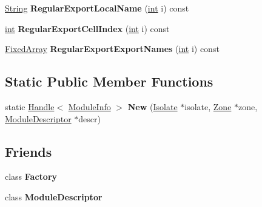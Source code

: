 \begin{DoxyCompactItemize}
\mbox{\hyperlink{classv8_1_1internal_1_1String}{String}} {\bfseries Regular\+Export\+Local\+Name} (\mbox{\hyperlink{classint}{int}} i) const
\item 
\mbox{\label{classv8_1_1internal_1_1ModuleInfo_a50adcfefadbb1e9b05e825f3f6f6dac1}} 
\mbox{\hyperlink{classint}{int}} {\bfseries Regular\+Export\+Cell\+Index} (\mbox{\hyperlink{classint}{int}} i) const
\item 
\mbox{\label{classv8_1_1internal_1_1ModuleInfo_a67d19826aee0713423b6adc55cda797b}} 
\mbox{\hyperlink{classv8_1_1internal_1_1FixedArray}{Fixed\+Array}} {\bfseries Regular\+Export\+Export\+Names} (\mbox{\hyperlink{classint}{int}} i) const
\end{DoxyCompactItemize}
\subsection*{Static Public Member Functions}
\begin{DoxyCompactItemize}
\item 
\mbox{\label{classv8_1_1internal_1_1ModuleInfo_a3c28ccc6fe0da94b38223636b7e341f6}} 
static \mbox{\hyperlink{classv8_1_1internal_1_1Handle}{Handle}}$<$ \mbox{\hyperlink{classv8_1_1internal_1_1ModuleInfo}{Module\+Info}} $>$ {\bfseries New} (\mbox{\hyperlink{classv8_1_1internal_1_1Isolate}{Isolate}} $\ast$isolate, \mbox{\hyperlink{classv8_1_1internal_1_1Zone}{Zone}} $\ast$zone, \mbox{\hyperlink{classv8_1_1internal_1_1ModuleDescriptor}{Module\+Descriptor}} $\ast$descr)
\end{DoxyCompactItemize}
\subsection*{Friends}
\begin{DoxyCompactItemize}
\item 
\mbox{\label{classv8_1_1internal_1_1ModuleInfo_a328c093d609680cca505905c6d49901a}} 
class {\bfseries Factory}
\item 
\mbox{\label{classv8_1_1internal_1_1ModuleInfo_a5d2418472b9082249e51af2d016872bd}} 
class {\bfseries Module\+Descriptor}
\end{DoxyCompactItemize}
